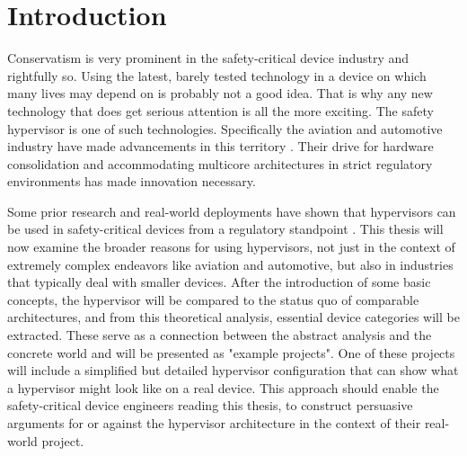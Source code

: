 
\chapter{Introduction} %

\label{Chapter1} %


\newcommand{\keyword}[1]{\textbf{#1}}
\newcommand{\bold}[1]{\textbf{#1}}
\newcommand{\tabhead}[1]{\textbf{#1}}
\newcommand{\code}[1]{\texttt{#1}}
\newcommand{\file}[1]{\texttt{\bfseries#1}}
\newcommand{\option}[1]{\texttt{\itshape#1}}

\newcommand{\mfg}{manufacturer}

Conservatism is very prominent in the safety-critical device industry and rightfully so. Using the latest, barely tested technology in a device on which many lives may depend on is probably not a good idea. That is why any new technology that does get serious attention is all the more exciting. The safety hypervisor is one of such technologies. Specifically the aviation and automotive industry have made advancements in this territory \cite{reinhardt2014embedded} \cite{vanderleest2015mpsoc}. Their drive for hardware consolidation and accommodating multicore architectures in strict regulatory environments has made innovation necessary.

Some prior research and real-world deployments have shown that hypervisors can be used in safety-critical devices from a regulatory standpoint \cite{larrucea2015modular}.
This thesis will now examine the broader reasons for using hypervisors, not just in the context of extremely complex endeavors like aviation and automotive, but also in industries that typically deal with smaller devices. After the introduction of some basic concepts, the hypervisor will be compared to the status quo of comparable architectures, and from this theoretical analysis, essential device categories will be extracted. These serve as a connection between the abstract analysis and the concrete world and will be presented as "example projects". One of these projects will include a simplified but detailed hypervisor configuration that can show what a hypervisor might look like on a real device. 
This approach should enable the safety-critical device engineers reading this thesis, to construct persuasive arguments for or against the hypervisor architecture in the context of their real-world project.

